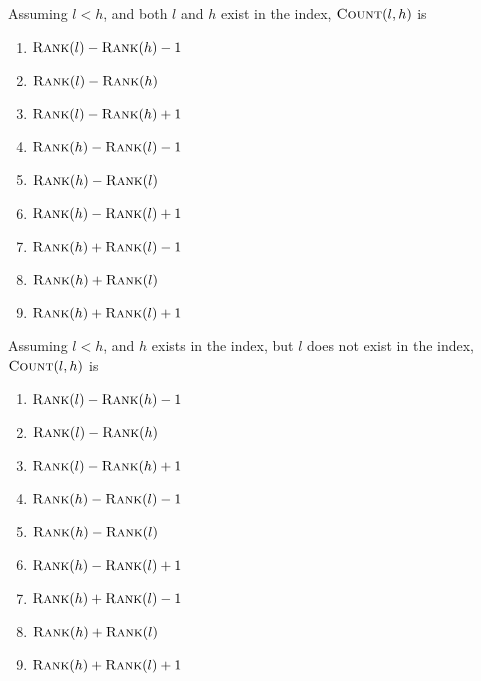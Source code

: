 \documentclass[12pt,twoside]{article}
\begin{document}
\begin{problems}
\begin{problemparts}
\problempart {} Assuming $l < h$, and both $l$ and $h$ exist in the
index, $\textnormal{\scshape Count}(l, h)$ is
\begin{enumerate}
  \item $\textnormal{\scshape Rank}(l) - \textnormal{\scshape Rank}(h) - 1$
  \item $\textnormal{\scshape Rank}(l) - \textnormal{\scshape Rank}(h)$
  \item $\textnormal{\scshape Rank}(l) - \textnormal{\scshape Rank}(h) + 1$
  \item $\textnormal{\scshape Rank}(h) - \textnormal{\scshape Rank}(l) - 1$
  \item $\textnormal{\scshape Rank}(h) - \textnormal{\scshape Rank}(l)$
  \item $\textnormal{\scshape Rank}(h) - \textnormal{\scshape Rank}(l) + 1$
  \item $\textnormal{\scshape Rank}(h) + \textnormal{\scshape Rank}(l) - 1$
  \item $\textnormal{\scshape Rank}(h) + \textnormal{\scshape Rank}(l)$
  \item $\textnormal{\scshape Rank}(h) + \textnormal{\scshape Rank}(l) + 1$
\end{enumerate}

\problempart {} Assuming $l < h$, and $h$ exists in the index, but $l$
does not exist in the index, $\textnormal{\scshape Count}(l, h)$ is
\begin{enumerate}
  \item $\textnormal{\scshape Rank}(l) - \textnormal{\scshape Rank}(h) - 1$
  \item $\textnormal{\scshape Rank}(l) - \textnormal{\scshape Rank}(h)$
  \item $\textnormal{\scshape Rank}(l) - \textnormal{\scshape Rank}(h) + 1$
  \item $\textnormal{\scshape Rank}(h) - \textnormal{\scshape Rank}(l) - 1$
  \item $\textnormal{\scshape Rank}(h) - \textnormal{\scshape Rank}(l)$
  \item $\textnormal{\scshape Rank}(h) - \textnormal{\scshape Rank}(l) + 1$
  \item $\textnormal{\scshape Rank}(h) + \textnormal{\scshape Rank}(l) - 1$
  \item $\textnormal{\scshape Rank}(h) + \textnormal{\scshape Rank}(l)$
  \item $\textnormal{\scshape Rank}(h) + \textnormal{\scshape Rank}(l) + 1$
\end{enumerate}


\end{problemparts}
\end{problems}
\end{document}
